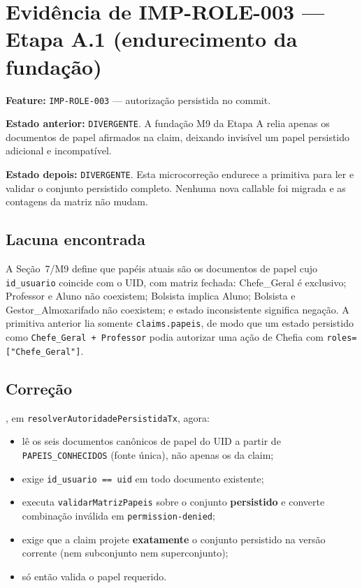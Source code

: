 \section{Evidência de IMP-ROLE-003 --- Etapa A.1 (endurecimento da fundação)}

\textbf{Feature:} \texttt{IMP-ROLE-003} --- autorização persistida no commit.

\textbf{Estado anterior:} \texttt{DIVERGENTE}. A fundação M9 da Etapa A relia
apenas os documentos de papel afirmados na claim, deixando invisível um papel
persistido adicional e incompatível.

\textbf{Estado depois:} \texttt{DIVERGENTE}. Esta microcorreção endurece a
primitiva para ler e validar o conjunto persistido completo. Nenhuma nova
callable foi migrada e as contagens da matriz não mudam.

\subsection{Lacuna encontrada}

A Seção~7/M9 define que papéis atuais são os documentos de papel cujo
\texttt{id\_usuario} coincide com o UID, com matriz fechada: Chefe\_Geral é
exclusivo; Professor e Aluno não coexistem; Bolsista implica Aluno; Bolsista e
Gestor\_Almoxarifado não coexistem; e estado inconsistente significa negação. A
primitiva anterior lia somente \texttt{claims.papeis}, de modo que um estado
persistido como \texttt{Chefe\_Geral + Professor} podia autorizar uma ação de
Chefia com \texttt{roles=["Chefe\_Geral"]}.

\subsection{Correção}

, em
\texttt{resolverAutoridadePersistidaTx}, agora:

\begin{itemize}
  \item lê os seis documentos canônicos de papel do UID a partir de
  \texttt{PAPEIS\_CONHECIDOS} (fonte única), não apenas os da claim;
  \item exige \texttt{id\_usuario == uid} em todo documento existente;
  \item executa \texttt{validarMatrizPapeis} sobre o conjunto
  \textbf{persistido} e converte combinação inválida em \texttt{permission-denied};
  \item exige que a claim projete \textbf{exatamente} o conjunto persistido na
  versão corrente (nem subconjunto nem superconjunto);
  \item só então valida o papel requerido.
\end{itemize}

